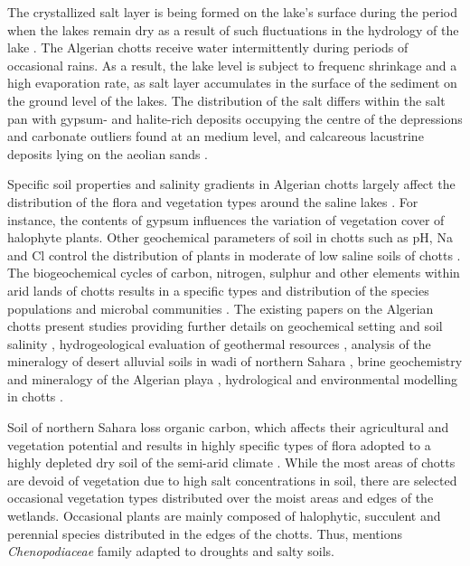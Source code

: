 \documentclass[asi,article,submit,pdftex,moreauthors]{Definitions/mdpi}
\begin{document}
The crystallized salt layer is being formed on the lake's surface during the period when the lakes remain dry as a result of such fluctuations in the hydrology of the lake  \cite{Remli}. The Algerian chotts receive water intermittently during periods of occasional rains. As a result, the lake level is subject to frequenc shrinkage and a high evaporation rate, as salt layer accumulates in the surface of the sediment on the ground level of the lakes. The distribution of the salt differs within the salt pan with gypsum- and halite-rich deposits occupying the centre of the depressions and carbonate outliers found at an medium level, and calcareous lacustrine deposits lying on the aeolian sands \cite{GASSE19871}. 

Specific soil properties and salinity gradients in Algerian chotts largely affect the distribution of the flora and vegetation types around the saline lakes \cite{Neffar}. For instance, the contents of gypsum influences the variation of vegetation cover of halophyte plants. Other geochemical parameters of soil in chotts such as pH, Na and Cl control the distribution of plants in moderate of low saline soils of chotts \cite{CHENCHOUNI2017660}. The biogeochemical cycles of carbon, nitrogen, sulphur and other elements within arid lands of chotts results in a specific types and distribution of the species populations and microbal communities \cite{BOUTAIBA2011909,QUADRI2016119}. The existing papers on the Algerian chotts present studies providing further details on geochemical setting and soil salinity \cite{Abdennour}, hydrogeological evaluation of geothermal resources \cite{BENMARCE2021104285,MELOUAH2021102211,Abdelaziz}, analysis of the mineralogy of desert alluvial soils in wadi of northern Sahara \cite{Djili}, brine geochemistry and mineralogy of the Algerian playa \cite{HamdiAissa,Valles}, hydrological and environmental modelling in chotts \cite{Samie}. 

Soil of northern Sahara loss organic carbon, which affects their agricultural and vegetation potential and results in highly specific types of flora adopted to a highly depleted dry soil of the semi-arid climate \cite{BOUBEHZIZ2020104539}. While the most areas of chotts are devoid of vegetation due to high salt concentrations in soil, there are selected occasional vegetation types distributed over the moist areas and edges of the wetlands. Occasional plants are mainly composed of halophytic, succulent and perennial species distributed in the edges of the chotts. Thus, \cite{KHAZNADAR2009369} mentions \emph{Chenopodiaceae} family adapted to droughts and salty soils.
\end{document}
